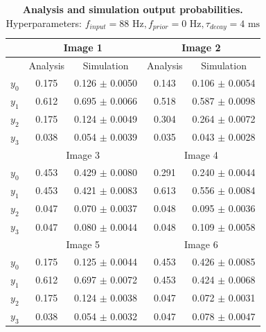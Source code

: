 \begin{table}[]
\centering
\label{tab:1D_88_0_4}
\small
\tabcolsep=0.11cm
\begin{tabular}{|c|cc|cc|}
\hline
                       & \multicolumn{2}{c|}{Image 1}                       & \multicolumn{2}{c|}{Image 2}                       \\ \hline
                       & \multicolumn{1}{c|}{Analysis} & Simulation         & \multicolumn{1}{c|}{Analysis} & Simulation         \\ \hline
$y_0$                  & \multicolumn{1}{c|}{0.175}    & 0.126 $\pm$ 0.0050 & \multicolumn{1}{c|}{0.143}    & 0.106 $\pm$ 0.0054 \\ \hline
$y_1$                  & \multicolumn{1}{c|}{0.612}    & 0.695 $\pm$ 0.0066 & \multicolumn{1}{c|}{0.518}    & 0.587 $\pm$ 0.0098 \\ \hline
$y_2$                  & \multicolumn{1}{c|}{0.175}    & 0.124 $\pm$ 0.0049 & \multicolumn{1}{c|}{0.304}    & 0.264 $\pm$ 0.0072 \\ \hline
$y_3$                  & \multicolumn{1}{c|}{0.038}    & 0.054 $\pm$ 0.0039 & \multicolumn{1}{c|}{0.035}    & 0.043 $\pm$ 0.0028 \\ \hline
                       & \multicolumn{2}{c|}{Image 3}                       & \multicolumn{2}{c|}{Image 4}                       \\ \hline
$y_0$                  & \multicolumn{1}{c|}{0.453}    & 0.429 $\pm$ 0.0080 & \multicolumn{1}{c|}{0.291}    & 0.240 $\pm$ 0.0044 \\ \hline
$y_1$                  & \multicolumn{1}{c|}{0.453}    & 0.421 $\pm$ 0.0083 & \multicolumn{1}{c|}{0.613}    & 0.556 $\pm$ 0.0084 \\ \hline
$y_2$                  & \multicolumn{1}{c|}{0.047}    & 0.070 $\pm$ 0.0037 & \multicolumn{1}{c|}{0.048}    & 0.095 $\pm$ 0.0036 \\ \hline
$y_3$                  & \multicolumn{1}{c|}{0.047}    & 0.080 $\pm$ 0.0044 & \multicolumn{1}{c|}{0.048}    & 0.109 $\pm$ 0.0058 \\ \hline
						& \multicolumn{2}{c|}{Image 5}                       & \multicolumn{2}{c|}{Image 6}                       \\ \hline
$y_0$                  & \multicolumn{1}{c|}{0.175}    & 0.125 $\pm$ 0.0044 & \multicolumn{1}{c|}{0.453}    & 0.426 $\pm$ 0.0085 \\ \hline
$y_1$                  & \multicolumn{1}{c|}{0.612}    & 0.697 $\pm$ 0.0072 & \multicolumn{1}{c|}{0.453}    & 0.424 $\pm$ 0.0068 \\ \hline
$y_2$                  & \multicolumn{1}{c|}{0.175}    & 0.124 $\pm$ 0.0038 & \multicolumn{1}{c|}{0.047}    & 0.072 $\pm$ 0.0031 \\ \hline
$y_3$                  & \multicolumn{1}{c|}{0.038}    & 0.054 $\pm$ 0.0032 & \multicolumn{1}{c|}{0.047}    & 0.078 $\pm$ 0.0047 \\ \hline
\end{tabular}
\caption{\textbf{Analysis and simulation output probabilities. } Hyperparameters: $f_{input} = 88\text{ Hz}, f_{prior} = 0\text{ Hz}, \tau_{decay} = 4\text{ ms}$}
\end{table}

